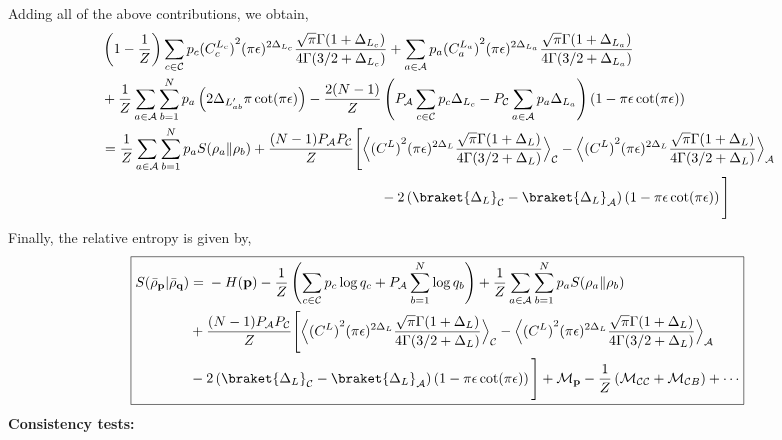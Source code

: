 \documentclass[11pt]{article}
\newcommand{\ep}{\epsilon}
\newcommand{\nn}{\nonumber}
\newcommand{\lb}{\left(}
\newcommand{\rb}{\right)}
\begin{document}
Adding all of the above contributions, we obtain,
\begin{align}
    &\lb1-\frac{1}{Z}\rb
\sum_{c\in\mathcal{C}}p_c {(C_c^{L_c})}^2
(\pi\ep)^{2\Delta_{L_c}}
\frac{\sqrt \pi \Gamma(1+ \Delta_{L_c})}{4\Gamma(3/2 + \Delta_{L_c})} +\sum_{a\in\mathcal{A}}p_a {(C_a^{L_a})}^2
(\pi\ep)^{2\Delta_{L_a}}
\frac{\sqrt \pi \Gamma(1+ \Delta_{L_a})}{4\Gamma(3/2 + \Delta_{L_a})} 
\nn \\
&+\frac{1}{Z}
\sum_{a\in\mathcal{A}}\sum_{b=1}^N
p_a\lb2\Delta_{L'_{ab}}\pi\cot(\pi\ep)\rb -\frac{2(N-1)}{Z} \lb  P_\mathcal{A}\sum_{c\in\mathcal{C}} p_c\Delta_{L_c} - P_\mathcal{C} \sum_{a\in\mathcal{A}} p_a\Delta_{L_a} \rb (1-\pi \ep\cot(\pi\ep)) \\
&= \frac{1}{Z}\sum_{a\in\mathcal{A}}\sum_{b=1}^N p_a S(\rho_a\|\rho_b) + \frac{(N-1)P_\mathcal{A}P_\mathcal{C}}{Z}\Bigg[ \Big\langle{{(C^L)}^2(\pi\ep)^{2\Delta_L}\frac{\sqrt \pi \Gamma(1+ \Delta_{L})}{4\Gamma(3/2 + \Delta_{L})} } \Big\rangle_\mathcal{C}- \Big\langle{{(C^L)}^2(\pi\ep)^{2\Delta_L}\frac{\sqrt \pi \Gamma(1+ \Delta_{L})}{4\Gamma(3/2 + \Delta_{L})} } \Big\rangle_\mathcal{A} \nn \\&\qquad\qquad\qquad\qquad\qquad\qquad\qquad\qquad\qquad\qquad -2\lb\braket{\Delta_L}_\mathcal{C}-\braket{\Delta_L}_\mathcal{A}\rb\lb1-\pi\ep\cot(\pi\ep)\rb\Bigg]
\end{align}
Finally, the relative entropy is given by,
\begin{align}
\boxed{
\begin{aligned}
S(\bar\rho_{\textbf{p}} | \bar\rho_{\textbf{q}})
&={}-H(\textbf{p})
-\frac{1}{Z}\lb
\sum_{c\in\mathcal{C}}p_c\log q_c
+P_\mathcal{A}\sum_{b=1}^N\log q_b
\rb + \frac{1}{Z}\sum_{a\in\mathcal{A}}\sum_{b=1}^N p_a S(\rho_a\|\rho_b)  
\\
&+\frac{(N-1)P_\mathcal{A}P_\mathcal{C}}{Z}\Bigg[ \Big\langle{{(C^L)}^2(\pi\ep)^{2\Delta_L}\frac{\sqrt \pi \Gamma(1+ \Delta_{L})}{4\Gamma(3/2 + \Delta_{L})} } \Big\rangle_\mathcal{C}- \Big\langle{{(C^L)}^2(\pi\ep)^{2\Delta_L}\frac{\sqrt \pi \Gamma(1+ \Delta_{L})}{4\Gamma(3/2 + \Delta_{L})} } \Big\rangle_\mathcal{A}  \\
&-2\lb\braket{\Delta_L}_\mathcal{C}-\braket{\Delta_L}_\mathcal{A}\rb\lb1-\pi\ep\cot(\pi\ep)\rb\Bigg]+\mathcal{M}_{\textbf{p}}
-\frac{1}{Z}\lb
\mathcal{M}_{\mathcal{C}\mathcal{C}}
+\mathcal{M}_{\mathcal{C}B}
\rb
+ \cdots
\end{aligned}
}
\end{align}
\textbf{Consistency tests:}
\end{document}

